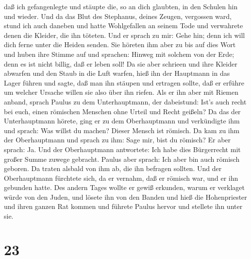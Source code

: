 daß ich gefangenlegte und stäupte die, so an dich glaubten, in den
Schulen hin und wieder.  Und da das Blut des Stephanus,
deines Zeugen, vergossen ward, stund ich auch daneben und hatte
Wohlgefallen an seinem Tode und verwahrete denen die Kleider, die ihn
töteten.  Und er sprach zu mir: Gehe hin; denn ich will
dich ferne unter die Heiden senden.  Sie höreten ihm aber
zu bis auf dies Wort und huben ihre Stimme auf und sprachen: Hinweg mit
solchem von der Erde; denn es ist nicht billig, daß er leben soll!
 Da sie aber schrieen und ihre Kleider abwarfen und den
Staub in die Luft warfen,  hieß ihn der Hauptmann in das
Lager führen und sagte, daß man ihn stäupen und ertragen sollte, daß er
erführe um welcher Ursache willen sie also über ihn riefen.
 Als er ihn aber mit Riemen anband, sprach Paulus zu dem
Unterhauptmann, der dabeistund: Ist's auch recht bei euch, einen
römischen Menschen ohne Urteil und Recht geißeln?  Da das
der Unterhauptmann hörete, ging er zu dem Oberhauptmann und verkündigte
ihm und sprach: Was willst du machen? Dieser Mensch ist römisch.
 Da kam zu ihm der Oberhauptmann und sprach zu ihm: Sage
mir, bist du römisch? Er aber sprach: Ja.  Und der
Oberhauptmann antwortete: Ich habe dies Bürgerrecht mit großer Summe
zuwege gebracht. Paulus aber sprach: Ich aber bin auch römisch geboren.
 Da traten alsbald von ihm ab, die ihn befragen sollten.
Und der Oberhauptmann fürchtete sich, da er vernahm, daß er römisch war,
und er ihn gebunden hatte.  Des andern Tages wollte er
gewiß erkunden, warum er verklaget würde von den Juden, und lösete ihn
von den Banden und hieß die Hohenpriester und ihren ganzen Rat kommen
und führete Paulus hervor und stellete ihn unter sie.

\hypertarget{section-22}{%
\section{23}\label{section-22}}

